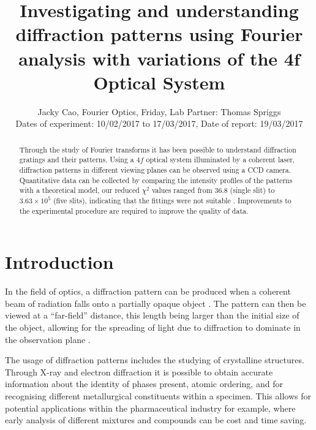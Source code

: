 \documentclass[twocolumn]{revtex4}
\begin{document}
\textheight=26.385cm

\title{Investigating and understanding diffraction patterns using Fourier analysis with variations of the $\boldsymbol{4f}$ Optical System}
 
\author{Jacky Cao, Fourier Optics, Friday, Lab Partner: Thomas Spriggs \\ Dates of experiment: 10/02/2017 to 17/03/2017, Date of report: 19/03/2017}

\begin{abstract}              
Through the study of Fourier transforms it has been possible to understand diffraction gratings and their patterns. Using a $4f$ optical system illuminated by a coherent laser, diffraction patterns in different viewing planes can be observed using a CCD camera. Quantitative data can be collected by comparing the intensity profiles of the patterns with a theoretical model, our reduced $\chi^2$ values ranged from 36.8 (single slit) to $3.63\times10^5$ (five slits), indicating that the fittings were not suitable \cite{hughesandhayes}. Improvements to the experimental procedure are required to improve the quality of data. 
\end{abstract}

\maketitle

\section{Introduction} 
\vspace{-2ex} 

In the field of optics, a diffraction pattern can be produced when a coherent beam of radiation falls onto a partially opaque object \cite{mathmethods}. The pattern can then be viewed at a ``far-field'' distance, this length being larger than the initial size of the object, allowing for the spreading of light due to diffraction to dominate in the observation plane \cite{of2f}. 

The usage of diffraction patterns includes the studying of crystalline structures. Through X-ray and electron diffraction it is possible to obtain accurate information about the identity of phases present, atomic ordering, and for recognising different metallurgical constituents within a specimen. This allows for potential applications within the pharmaceutical industry for example, where early analysis of different mixtures and compounds can be cost and time saving. \cite{elecdiffraction, xraypharma}
\end{document}
